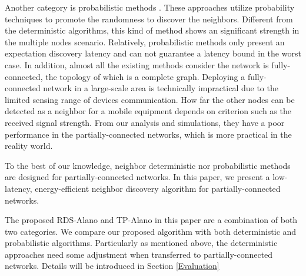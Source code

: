 Another category is probabilistic methods \cite{mcglynn2001birthday,
vasudevan2009neighbor,you2011aloha,song2014probabilistic}. These
approaches utilize probability techniques to promote the randomness 
to discover the neighbors. Different from the deterministic algorithms, 
this kind of method shows an significant strength in the multiple nodes scenario. 
Relatively, probabilistic methods only present an expectation discovery latency and 
can not guarantee a latency bound in the worst case.
In addition, almost all the existing methods consider the network is fully-connected,
the topology of which is a complete graph. Deploying a fully-connected network 
in a large-scale area is technically impractical 
due to the limited sensing range of devices communication.
How far the other nodes can be detected as a neighbor for a mobile equipment  
depends on criterion such as the received signal strength.
From our analysis and simulations, 
they have a poor performance in the partially-connected networks, which is more 
practical in the reality world.

To the best of our knowledge, neighbor deterministic nor probabilistic methods are designed for
partially-connected networks. In this paper, we present a low-latency, energy-efficient 
neighbor discovery algorithm for partially-connected networks.

The proposed RDS-Alano and TP-Alano in this paper are a combination of both two categories.
We compare our proposed algorithm with both deterministic and probabilistic algorithms. 
Particularly as mentioned above, the deterministic approaches need some adjustment 
when transferred to partially-connected networks. Details will be introduced in Section \ref{Evaluation}




